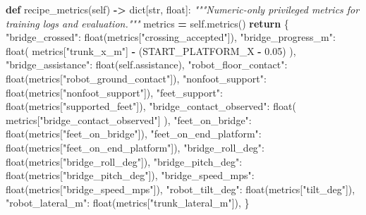 \documentclass[
  chinese,
  11pt,
  letterpaper,
]{article}
\newenvironment{Shaded}{\begin{snugshade}}{\end{snugshade}}
\newcommand{\BuiltInTok}[1]{#1}
\newcommand{\CommentTok}[1]{\textcolor[rgb]{0.56,0.35,0.01}{\textit{#1}}}
\newcommand{\ControlFlowTok}[1]{\textcolor[rgb]{0.13,0.29,0.53}{\textbf{#1}}}
\newcommand{\FloatTok}[1]{\textcolor[rgb]{0.00,0.00,0.81}{#1}}
\newcommand{\KeywordTok}[1]{\textcolor[rgb]{0.13,0.29,0.53}{\textbf{#1}}}
\newcommand{\NormalTok}[1]{#1}
\newcommand{\OperatorTok}[1]{\textcolor[rgb]{0.81,0.36,0.00}{\textbf{#1}}}
\newcommand{\StringTok}[1]{\textcolor[rgb]{0.31,0.60,0.02}{#1}}
\newcommand{\VariableTok}[1]{\textcolor[rgb]{0.00,0.00,0.00}{#1}}
\renewenvironment{Shaded}{\par\smallskip}{\par\smallskip}
\begin{document}
\begin{Shaded}
\begin{Highlighting}[]
    \KeywordTok{def}\NormalTok{ recipe\_metrics(}\VariableTok{self}\NormalTok{) }\OperatorTok{{-}\textgreater{}} \BuiltInTok{dict}\NormalTok{[}\BuiltInTok{str}\NormalTok{, }\BuiltInTok{float}\NormalTok{]:}
        \CommentTok{"""Numeric{-}only privileged metrics for training logs and evaluation."""}
\NormalTok{        metrics }\OperatorTok{=} \VariableTok{self}\NormalTok{.metrics()}
        \ControlFlowTok{return}\NormalTok{ \{}
            \StringTok{"bridge\_crossed"}\NormalTok{: }\BuiltInTok{float}\NormalTok{(metrics[}\StringTok{"crossing\_accepted"}\NormalTok{]),}
            \StringTok{"bridge\_progress\_m"}\NormalTok{: }\BuiltInTok{float}\NormalTok{(}
\NormalTok{                metrics[}\StringTok{"trunk\_x\_m"}\NormalTok{] }\OperatorTok{{-}}\NormalTok{ (START\_PLATFORM\_X }\OperatorTok{{-}} \FloatTok{0.05}\NormalTok{)}
\NormalTok{            ),}
            \StringTok{"bridge\_assistance"}\NormalTok{: }\BuiltInTok{float}\NormalTok{(}\VariableTok{self}\NormalTok{.assistance),}
            \StringTok{"robot\_floor\_contact"}\NormalTok{: }\BuiltInTok{float}\NormalTok{(metrics[}\StringTok{"robot\_ground\_contact"}\NormalTok{]),}
            \StringTok{"nonfoot\_support"}\NormalTok{: }\BuiltInTok{float}\NormalTok{(metrics[}\StringTok{"nonfoot\_support"}\NormalTok{]),}
            \StringTok{"feet\_support"}\NormalTok{: }\BuiltInTok{float}\NormalTok{(metrics[}\StringTok{"supported\_feet"}\NormalTok{]),}
            \StringTok{"bridge\_contact\_observed"}\NormalTok{: }\BuiltInTok{float}\NormalTok{(}
\NormalTok{                metrics[}\StringTok{"bridge\_contact\_observed"}\NormalTok{]}
\NormalTok{            ),}
            \StringTok{"feet\_on\_bridge"}\NormalTok{: }\BuiltInTok{float}\NormalTok{(metrics[}\StringTok{"feet\_on\_bridge"}\NormalTok{]),}
            \StringTok{"feet\_on\_end\_platform"}\NormalTok{: }\BuiltInTok{float}\NormalTok{(metrics[}\StringTok{"feet\_on\_end\_platform"}\NormalTok{]),}
            \StringTok{"bridge\_roll\_deg"}\NormalTok{: }\BuiltInTok{float}\NormalTok{(metrics[}\StringTok{"bridge\_roll\_deg"}\NormalTok{]),}
            \StringTok{"bridge\_pitch\_deg"}\NormalTok{: }\BuiltInTok{float}\NormalTok{(metrics[}\StringTok{"bridge\_pitch\_deg"}\NormalTok{]),}
            \StringTok{"bridge\_speed\_mps"}\NormalTok{: }\BuiltInTok{float}\NormalTok{(metrics[}\StringTok{"bridge\_speed\_mps"}\NormalTok{]),}
            \StringTok{"robot\_tilt\_deg"}\NormalTok{: }\BuiltInTok{float}\NormalTok{(metrics[}\StringTok{"tilt\_deg"}\NormalTok{]),}
            \StringTok{"robot\_lateral\_m"}\NormalTok{: }\BuiltInTok{float}\NormalTok{(metrics[}\StringTok{"trunk\_lateral\_m"}\NormalTok{]),}
\NormalTok{        \}}
\end{Highlighting}
\end{Shaded}
\end{document}
